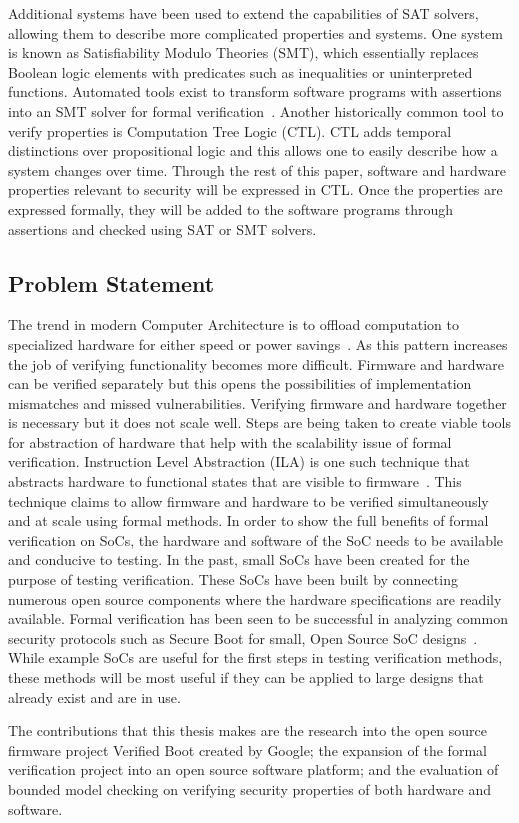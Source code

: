 \documentclass[../report.tex]{subfiles}
\begin{document}
Additional systems have been used to extend the capabilities of SAT solvers, allowing them to describe more complicated properties and systems. 
One system is known as Satisfiability Modulo Theories (SMT), which essentially replaces Boolean logic elements with predicates such as inequalities or uninterpreted functions. 
Automated tools exist to transform software programs with assertions into an SMT solver for formal verification~\cite{z3-smt-solver}.
Another historically common tool to verify properties is Computation Tree Logic (CTL).
CTL adds temporal distinctions over propositional logic and this allows one to easily describe how a system changes over time.
Through the rest of this paper, software and hardware properties relevant to security will be expressed in CTL\@. 
Once the properties are expressed formally, they will be added to the software programs through assertions and checked using SAT or SMT solvers.

\subsection{Problem Statement}

The trend in modern Computer Architecture is to offload computation to specialized hardware for either speed or power savings~\cite{hardware-accel}.
As this pattern increases the job of verifying functionality  becomes more difficult.
Firmware and hardware can be verified separately but this opens the possibilities of implementation mismatches and missed vulnerabilities.
Verifying firmware and hardware together is necessary but it does not scale well. 
Steps are being taken to create viable tools for abstraction of hardware that help with the scalability issue of formal verification.
Instruction Level Abstraction (ILA) is one such technique that abstracts hardware to functional states that are visible to firmware~\cite{ila}.
This technique claims to allow firmware and hardware to be verified simultaneously and at scale using formal methods.
In order to show the full benefits of formal verification on SoCs, the hardware and software of the SoC needs to be available and conducive to testing.
In the past, small SoCs have been created for the purpose of testing verification.
These SoCs have been built by connecting numerous open source components where the hardware specifications are readily available.
Formal verification has been seen to be successful in analyzing common security protocols such as Secure Boot for small, Open Source SoC designs~\cite{elane}. 
While example SoCs are useful for the first steps in testing verification methods, these methods will be most useful if they can be applied to large designs that already exist and are in use.

The contributions that this thesis makes are the research into the open source firmware project Verified Boot created by Google; the expansion of the formal verification project into an open source software platform; and the evaluation of bounded model checking on verifying security properties of both hardware and software.

\end{document}
